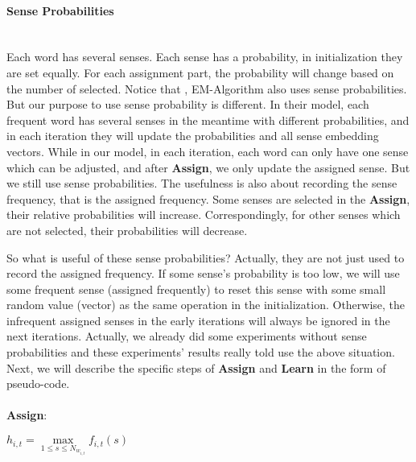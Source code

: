 \paragraph{Sense Probabilities}\ \\
Each word has several senses. Each sense has a probability, in initialization they are set equally. For each assignment part, the probability will change based on the number of selected. Notice that , EM-Algorithm also uses sense probabilities. But our purpose to use sense probability is different. In their model, each frequent word has several senses in the meantime  with different probabilities, and in each iteration they will update the probabilities and all sense embedding vectors. While in our model, in each iteration, each word can only have one sense which can be adjusted, and after \textbf{Assign}, we only update the assigned sense. But we still use sense probabilities. The usefulness is also about recording the sense frequency, that is the assigned frequency. Some senses are selected in the \textbf{Assign}, their relative probabilities will increase. Correspondingly, for other senses which are not selected, their probabilities will decrease. 

So what is useful of these sense probabilities? Actually, they are not just used to record the assigned frequency. If some sense's probability is too low, we will use some frequent sense (assigned frequently) to reset this sense with some small random value (vector) as the same operation in the initialization. Otherwise, the infrequent assigned senses in the early iterations will always be ignored in the next iterations. Actually, we already did some experiments without sense probabilities and these experiments' results really told use the above situation. \\


Next, we will describe the specific steps of \textbf{Assign} and \textbf{Learn} in the form of pseudo-code.

\paragraph{} \textbf{Assign}:\\
\begin{algorithmic}
	 
  \Repeat 
   
\State $h_{i,t} = \max\limits_{1\leq s\leq N_{w_{i,t}}} f_{i,t}(s)$ 
  \EndFor
	\EndFor
	
\end{algorithmic}

